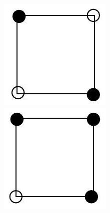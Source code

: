 \documentclass[10pt]{article}
\begin{document}
\includegraphics[max width=\textwidth, center]{2025_09_05_3ba26226ec0baddb5a03g-50(9)}\\
\includegraphics[max width=\textwidth, center]{2025_09_05_3ba26226ec0baddb5a03g-50(11)}\\
\end{document}
